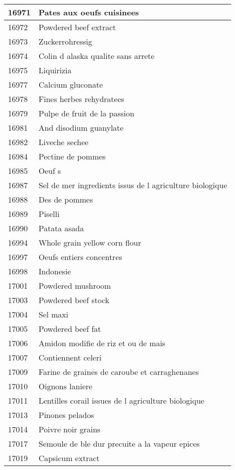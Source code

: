 \begin{longtable}{|l|l|}
16971 & Pates aux oeufs cuisinees \\ \hline 
16972 & Powdered beef extract \\ \hline 
16973 & Zuckerrohressig \\ \hline 
16974 & Colin d alaska qualite sans arrete \\ \hline 
16975 & Liquirizia \\ \hline 
16977 & Calcium gluconate \\ \hline 
16978 & Fines herbes rehydratees \\ \hline 
16979 & Pulpe de fruit de la passion \\ \hline 
16981 & And disodium guanylate \\ \hline 
16982 & Liveche sechee \\ \hline 
16984 & Pectine de pommes \\ \hline 
16985 & Oeuf s \\ \hline 
16987 & Sel de mer  ingredients issus de l agriculture biologique \\ \hline 
16988 & Des de pommes \\ \hline 
16989 & Piselli \\ \hline 
16990 & Patata asada \\ \hline 
16994 & Whole grain yellow corn flour \\ \hline 
16997 & Oeufs entiers concentres \\ \hline 
16998 & Indonesie \\ \hline 
17001 & Powdered mushroom \\ \hline 
17003 & Powdered beef stock \\ \hline 
17004 & Sel maxi \\ \hline 
17005 & Powdered beef fat \\ \hline 
17006 & Amidon modifie de riz et ou de mais \\ \hline 
17007 & Contiennent celeri \\ \hline 
17009 & Farine de graines de caroube et carraghenanes \\ \hline 
17010 & Oignons laniere \\ \hline 
17011 & Lentilles corail issues de l agriculture biologique \\ \hline 
17013 & Pinones pelados \\ \hline 
17014 & Poivre noir grains \\ \hline 
17017 & Semoule de ble dur precuite a la vapeur epices \\ \hline 
17019 & Capsicum extract \\ \hline 

\end{longtable}
